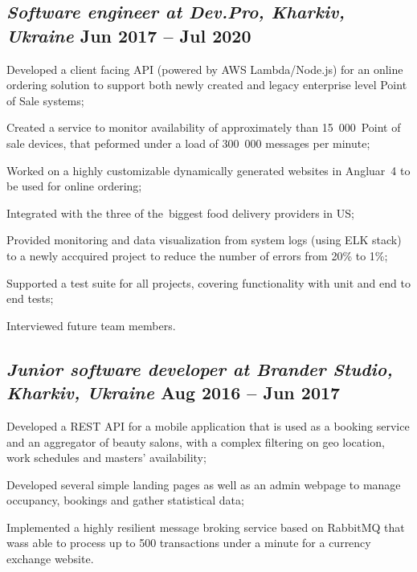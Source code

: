 \documentclass[a4paper,12pt]{book}
\begin{document}
\subsection{{\sl\bf\hspace{0.1in}Software engineer at Dev.Pro, Kharkiv, Ukraine} \hfill Jun 2017 -- Jul 2020}
\begin{zitemize}
 \item Developed a client facing API (powered by AWS Lambda/Node.js) for an online ordering solution to support both newly created and legacy enterprise level Point of Sale systems;
 \item Created a service to monitor availability of approximately than 15~000~Point of sale devices, that peformed under a load of 300~000 messages per minute;
 \item Worked on a highly customizable dynamically generated websites in Angluar~4 to be used for online ordering;
 \item Integrated with the three of the~biggest food delivery providers in US;
 \item Provided monitoring and data visualization from system logs (using ELK stack) to a newly accquired project to reduce the number of errors from 20\% to 1\%;
 \item Supported a test suite for all projects, covering functionality with unit and end to end tests;
 \item Interviewed future team members.
\end{zitemize}

\subsection{{\sl\bf\hspace{0.1in} Junior software developer at Brander Studio, Kharkiv, Ukraine} \hfill Aug 2016 -- Jun 2017}
\begin{zitemize}
 \item Developed a REST API for a mobile application that is used as a booking service and an aggregator of beauty salons, with a complex filtering on geo location, work schedules and masters' availability;
 \item Developed several simple landing pages as well as an admin webpage to manage occupancy, bookings and gather statistical data;
 \item Implemented a highly resilient message broking service based on RabbitMQ that wass able to process up to 500 transactions under a minute for a currency exchange website.
\end{zitemize}
\end{document}
